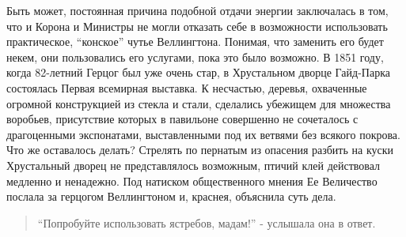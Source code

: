 \documentclass[
  oneside,
  12pt,
  titlepage]{book}
\begin{document}
Быть может, постоянная причина подобной отдачи энергии заключалась в том, что и Корона и Министры не могли отказать себе в возможности использовать практическое, ``конское'' чутье Веллингтона. Понимая, что заменить его будет некем, они пользовались его услугами, пока это было возможно. В 1851 году, когда 82-летний Герцог был уже очень стар, в Хрустальном дворце Гайд-Парка состоялась Первая всемирная выставка. К несчастью, деревья, охваченные огромной конструкцией из стекла и стали, сделались убежищем для множества воробьев, присутствие которых в павильоне совершенно не сочеталось с драгоценными экспонатами, выставленными под их ветвями без всякого покрова. Что же оставалось делать? Стрелять по пернатым из опасения разбить на куски Хрустальный дворец не представлялось возможным, птичий клей действовал медленно и ненадежно. Под натиском общественного мнения Ее Величество послала за герцогом Веллингтоном и, краснея, объяснила суть дела.

\begin{quote}
``Попробуйте использовать ястребов, мадам!'' - услышала она в ответ.
\end{quote}
\end{document}
